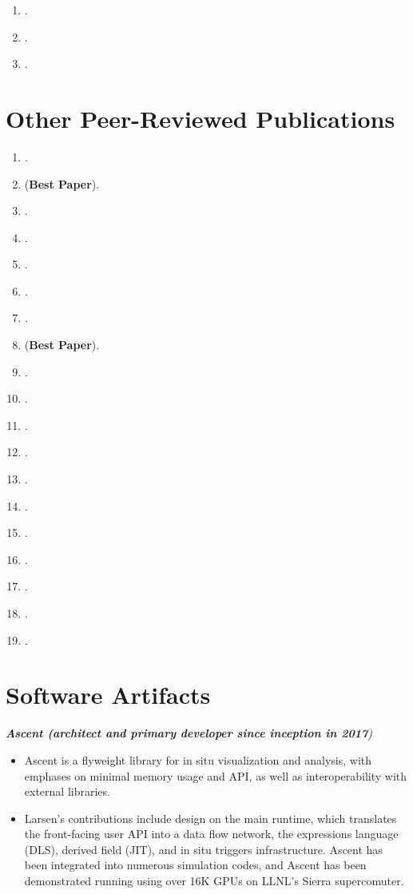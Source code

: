 \documentclass[margin,line]{res}
\begin{document}
\begin{resume}
\begin{enumerate}
	\item {}.
	\item {}.
	\item {}.


\end{enumerate}
\section{\sc Other Peer-Reviewed Publications}
\begin{enumerate}[resume]
	\item {}.
	\item {} (\textbf{Best Paper}).
	\item {}.
	\item {}.
	\item {}.
	\item {}.
	\item {}.
	\item {} (\textbf{Best Paper}).
	\item {}.
	\item {}.
	\item {}.
	\item {}.
	\item {}.
	\item {}.
	\item {}.
	\item {}.
	\item {}.
	\item {}.
	\item {}.
\end{enumerate}

\section{\sc Software Artifacts}
{\em \textbf{Ascent (architect and primary developer since inception in 2017}) }
\begin{itemize}
	\item Ascent is a flyweight library for in situ visualization and analysis, with emphases on minimal
	memory usage and API, as well as interoperability with external libraries.
	\item Larsen's contributions include design on the main runtime, which translates the front-facing user API into a data flow network, the expressions language (DLS), derived field (JIT), and in situ triggers infrastructure. Ascent has been integrated into numerous simulation codes, and Ascent has been demonstrated running using over 16K GPUs on LLNL's Sierra supercomuter.
\end{itemize}


\end{resume}
\end{document}
